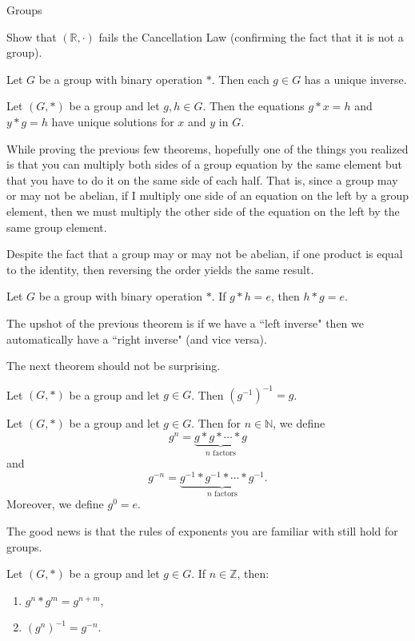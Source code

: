 \begin{section}{Groups}
\begin{exercise}
Show that $(\mathbb{R},\cdot)$ fails the Cancellation Law (confirming the fact that it is not a group).
\end{exercise}

\begin{corollary}
Let $G$ be a group with binary operation $*$.  Then each $g\in G$ has a unique inverse.
\end{corollary}

\begin{theorem}\label{thm:unique_soln}
Let $(G,*)$ be a group and let $g,h\in G$.  Then the equations $g*x=h$ and $y*g=h$ have unique solutions for $x$ and $y$ in $G$.  
\end{theorem}

While proving the previous few theorems, hopefully one of the things you realized is that you can multiply both sides of a group equation by the same element but that you have to do it on the same side of each half.  That is, since a group may or may not be abelian, if I multiply one side of an equation on the left by a group element, then we must multiply the other side of the equation on the left by the same group element.

Despite the fact that a group may or may not be abelian, if one product is equal to the identity, then reversing the order yields the same result.

\begin{theorem}
Let $G$ be a group with binary operation $*$.  If $g*h=e$, then $h*g=e$.
\end{theorem}

The upshot of the previous theorem is if we have a ``left inverse" then we automatically have a ``right inverse" (and vice versa).

The next theorem should not be surprising.

\begin{theorem}
Let $(G,*)$ be a group and let $g\in G$.  Then $(g^{-1})^{-1}=g$.
\end{theorem}

\begin{definition}
Let $(G,*)$ be a group and let $g\in G$.  Then for $n\in \mathbb{N}$, we define
\[
g^n=\underbrace{g*g*\cdots *g}_{n\text{ factors}}
\]
and
\[
g^{-n}=\underbrace{g^{-1}*g^{-1}*\cdots *g^{-1}}_{n\text{ factors}}.
\]
Moreover, we define $g^0=e$.
\end{definition}

The good news is that the rules of exponents you are familiar with still hold for groups.

\begin{theorem}
Let $(G,*)$ be a group and let $g\in G$.  If $n\in\mathbb{Z}$, then:
\begin{enumerate}
\item $g^n*g^m=g^{n+m}$,
\item $(g^n)^{-1}=g^{-n}$.
\end{enumerate}
\end{theorem}

\end{section}

